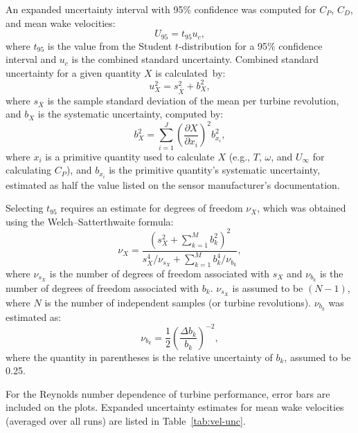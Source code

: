 \documentclass[energies,article,accept,moreauthors,pdftex,10pt,a4paper]{mdpi}
\theoremstyle{mdpi}
\newcounter{ex}
\newcounter{re}
\begin{document}
An expanded uncertainty interval with 95\% confidence was computed for
$C_P$, $C_D$, and mean wake velocities:
\begin{equation}
 U_{95} = t_{95} u_c,
\end{equation}
where $t_{95}$ is the value from the Student $t$-distribution for a 95\%
confidence interval and $u_c$ is the combined standard uncertainty. Combined
standard uncertainty for a given quantity $X$ is calculated~by:
\begin{equation}
 u_X^2 = s_{\bar{X}}^2 + b_X^2,
\end{equation}
where $s_{\bar{X}}$ is the sample standard deviation of the mean per turbine
revolution, and $b_X$ is the systematic uncertainty, computed by:
\begin{equation}
 b_{X}^2 = \sum_{i=1}^J \left( \frac{\partial X}{\partial x_i} \right)^2
 b_{x_i}^2,
\end{equation}
where $x_i$ is a primitive quantity used to calculate $X$ (e.g., $T$, $\omega$,
and $U_\infty$ for calculating $C_P$), and $b_{x_i}$ is the primitive quantity's
systematic uncertainty, estimated as half the value listed on the sensor
manufacturer's documentation.

Selecting $t_{95}$ requires an estimate for degrees of freedom $\nu_X$, which
was obtained using the Welch--Satterthwaite formula:
\begin{equation}
 \nu_X = \frac{\left(s_X^2 + \sum_{k=1}^M b_k^2 \right)^2} {s_X^4/\nu_{s_X} +
 \sum_{k=1}^M b_k^4/\nu_{b_k}},
\end{equation}
where $\nu_{s_X}$ is the number of degrees of freedom associated with $s_X$ and
$\nu_{b_k}$ is the number of degrees of freedom associated with $b_k$.
$\nu_{s_X}$ is assumed to be $(N-1)$, where $N$ is the number of independent
samples (or turbine revolutions). $\nu_{b_k}$ was estimated as:
\begin{equation}
 \nu_{b_k} = \frac{1}{2} \left( \frac{\Delta b_k}{b_k} \right)^{-2},
\end{equation}
where the quantity in parentheses is the relative uncertainty of $b_k$, assumed
to be 0.25.

For the Reynolds number dependence of turbine performance, error bars are
included on the plots. Expanded uncertainty estimates for mean wake velocities
(averaged over all runs) are listed in Table~\ref{tab:vel-unc}.
\end{document}

